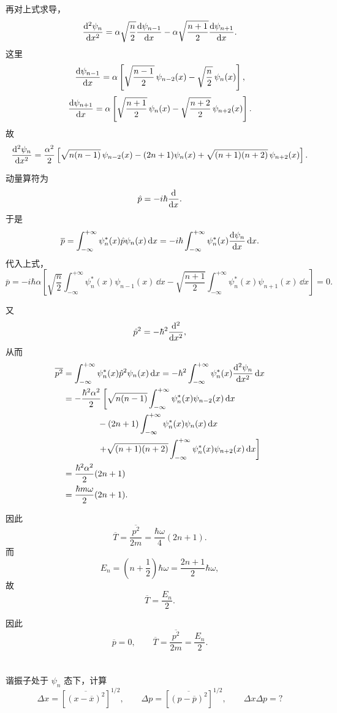 \documentclass[10pt,a4paper]{article}
\begin{document}
再对上式求导，
\[
\dv[2]{\psi_n}{x}
=
\alpha\sqrt{\frac{n}{2}}\dv{\psi_{n-1}}{x}
-\alpha\sqrt{\frac{n+1}{2}}\dv{\psi_{n+1}}{x}.
\]
这里
\[
\dv{\psi_{n-1}}{x}
=
\alpha\left[ \sqrt{\frac{n-1}{2}}\,\psi_{n-2}(x)-\sqrt{\frac{n}{2}}\,\psi_n(x) \right],
\]
\[
\dv{\psi_{n+1}}{x}
=
\alpha\left[ \sqrt{\frac{n+1}{2}}\,\psi_n(x)-\sqrt{\frac{n+2}{2}}\,\psi_{n+2}(x) \right].
\]
故
\[
\dv[2]{\psi_n}{x}
=
\frac{\alpha^2}{2}\left[
\sqrt{n(n-1)}\,\psi_{n-2}(x)
-(2n+1)\psi_n(x)
+\sqrt{(n+1)(n+2)}\,\psi_{n+2}(x)
\right].
\]

动量算符为
\[
\hat{p}=-i\hbar \dv{}{x}.
\]
于是
\[
\overline{p}
=
\int_{-\infty}^{+\infty}\psi_n^*(x)\hat{p}\psi_n(x)\, \dd x
=
-i\hbar\int_{-\infty}^{+\infty}\psi_n^*(x)\dv{\psi_n}{x}\, \dd x.
\]
代入上式，
\[
\overline{p}
=
-i\hbar\alpha\left[
\sqrt{\frac{n}{2}}\int_{-\infty}^{+\infty}\psi_n^*(x)\psi_{n-1}(x)\, \dd x
-\sqrt{\frac{n+1}{2}}\int_{-\infty}^{+\infty}\psi_n^*(x)\psi_{n+1}(x)\, \dd x
\right]=0.
\]

又
\[
\hat{p}^2=-\hbar^2 \dv[2]{}{x},
\]
从而
\begin{align*}
  \overline{p^2}
&=
\int_{-\infty}^{+\infty}\psi_n^*(x)\hat{p}^2\psi_n(x)\, \dd x
=
-\hbar^2\int_{-\infty}^{+\infty}\psi_n^*(x)\dv[2]{\psi_n}{x}\, \dd x\\
&=-\frac{\hbar^2\alpha^2}{2}\left[
\sqrt{n(n-1)}\int_{-\infty}^{+\infty}\psi_n^*(x)\psi_{n-2}(x)\, \dd x \right.\\
&\qquad \qquad-(2n+1)\int_{-\infty}^{+\infty}\psi_n^*(x)\psi_n(x)\, \dd x \\
&\qquad \qquad \left.+\sqrt{(n+1)(n+2)}\int_{-\infty}^{+\infty}\psi_n^*(x)\psi_{n+2}(x)\, \dd x\right]\\
&=\frac{\hbar^2\alpha^2}{2}(2n+1)\\
&=\frac{\hbar m\omega}{2}(2n+1).
\end{align*}

因此
\[
\overline{T}
=
\frac{\overline{p^2}}{2m}
=
\frac{\hbar\omega}{4}(2n+1).
\]
而
\[
E_n=\left( n+\frac{1}{2} \right)\hbar\omega=\frac{2n+1}{2}\hbar\omega,
\]
故
\[
\overline{T}=\frac{E_n}{2}.
\]

因此
\[
\overline{p}=0,
\qquad
\overline{T}=\frac{\overline{p^2}}{2m}=\frac{E_n}{2}.
\]


\section{}
谐振子处于 $\psi_n$ 态下，计算
\[
\Delta x=\left[\overline{(x-\overline{x})^2}\right]^{1/2},\qquad
\Delta p=\left[\overline{(p-\overline{p})^2}\right]^{1/2},\qquad
\Delta x\Delta p=?
\]
\end{document}
